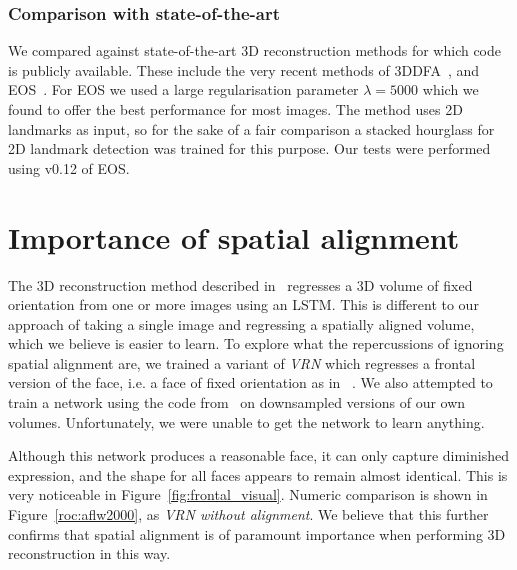 \subsubsection{Comparison with state-of-the-art}
We compared against state-of-the-art 3D reconstruction methods for
which code is publicly available. These include the very recent
methods of 3DDFA~\cite{zhu2016face}, and
EOS~\cite{huber2016multiresolution}. For EOS we used a large
regularisation parameter $\lambda = 5000$ which we found to offer the
best performance for most images. The method uses 2D landmarks as
input, so for the sake of a fair comparison a stacked hourglass for 2D
landmark detection was trained for this purpose. Our tests were
performed using v0.12 of EOS.


\section{Importance of spatial alignment}
\label{sec:spatialimportance}

The 3D reconstruction method described in~\cite{choy20163d} regresses
a 3D volume of fixed orientation from one or more images using an
LSTM. This is different to our approach of taking a single image and
regressing a spatially aligned volume, which we believe is easier to
learn. To explore what the repercussions of ignoring spatial alignment
are, we trained a variant of \textit{VRN} which regresses a frontal
version of the face, i.e. a face of fixed orientation as in
~\cite{choy20163d}. We also attempted to train a network using the
code from~\cite{choy20163d} on downsampled versions of our own
volumes. Unfortunately, we were unable to get the network to learn
anything.

Although this network produces a reasonable face, it can only capture
diminished expression, and the shape for all faces appears to remain
almost identical. This is very noticeable in
Figure~\ref{fig:frontal_visual}. Numeric comparison is shown in
Figure~\ref{roc:aflw2000}, as \textit{VRN without alignment}. We
believe that this further confirms that spatial alignment is of
paramount importance when performing 3D reconstruction in this way.

